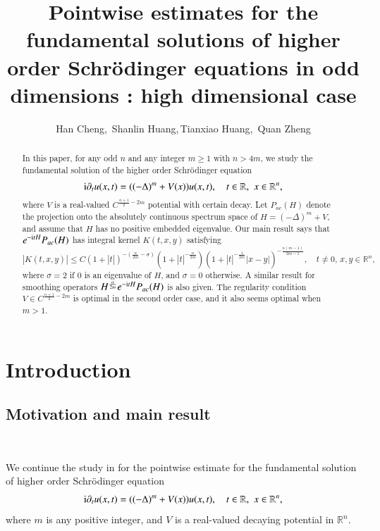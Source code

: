 \documentclass[11pt,reqno]{amsart}
\title[]
{Pointwise estimates for the fundamental solutions of higher order Schr\"{o}dinger equations in odd dimensions \uppercase\expandafter{\romannumeral2}: high  dimensional case}
\author{Han Cheng,\, Shanlin Huang,\,Tianxiao Huang,\,  Quan Zheng}
\def\i{{\rm i}}
\numberwithin{equation}{section}
\theoremstyle{definition}
\begin{document}
\begin{abstract}
In this paper, for any odd $n$ and any integer $m\geq1$ with $n>4m$, we  study  the fundamental solution of the  higher order Schr\"{o}dinger equation
\begin{equation*}
\i\partial_tu(x, t)=((-\Delta)^m+V(x))u(x, t), \quad t\in \mathbb{R},\,\,x\in \mathbb{R}^n,
\end{equation*}
where $V$ is a real-valued $C^{\frac{n+1}{2}-2m}$ potential with certain  decay.
Let $P_{ac}(H)$ denote the projection onto the absolutely continuous spectrum space of $H=(-\Delta)^m+V$, and assume that $H$ has no positive embedded eigenvalue.
Our main result says that
$e^{-\i tH}P_{ac}(H)$ has integral kernel $K(t,x,y)$ satisfying
\begin{equation*}
|K(t, x,y)|\le C(1+|t|)^{-(\frac{n}{2m}-\sigma)}(1+|t|^{-\frac{n}{2 m}})\left(1+|t|^{-\frac{1}{2 m}}|x-y|\right)^{-\frac{n(m-1)}{2 m-1}},\quad t\neq0,\,x,y\in\mathbb{R}^n,
\end{equation*}
where $\sigma=2$ if $0$ is an eigenvalue of $H$, and $\sigma=0$ otherwise. A similar result for smoothing operators $H^\frac{\alpha}{2m}e^{-\i tH}P_{ac}(H)$ is also given. The regularity condition $V\in C^{\frac{n+1}{2}-2m}$ is optimal in the second order case, and it also seems optimal when $m>1$.
\end{abstract}

\maketitle
\begingroup
\tableofcontents

\section{Introduction}\label{section1}

\subsection{Motivation and main result}\

We continue the study in \cite{CHHZ} for the pointwise estimate for the fundamental solution of higher order Schr\"{o}dinger equation
\begin{equation}\label{equ1.1.1}
	\i\partial_tu(x, t)=((-\Delta)^m+V(x))u(x, t), \quad t\in \mathbb{R},\,\,x\in \mathbb{R}^n,
\end{equation}
where $m$ is any positive integer, and $V$ is a real-valued decaying potential in $\mathbb{R}^n$.
\end{document}
